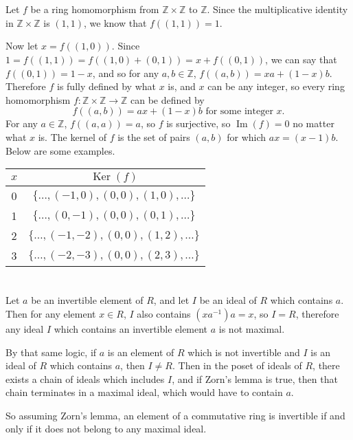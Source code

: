 \documentclass[12pt]{article}
\begin{document}
\section{}
\noindent{}\bigskip\par
Let $f$ be a ring homomorphism from $ \mathbb{Z} \times \mathbb{Z}$ to $ \mathbb{Z}$. Since the multiplicative identity in $ \mathbb{Z} \times \mathbb{Z}$ is $(1,1)$, we know that $f((1,1)) = 1$.
\par
Now let $x=f((1,0))$. Since $1=f((1,1))=f((1,0)+(0,1))=x+f((0,1))$, we can say that $f((0,1))=1-x$, and so for any $a,b \in \mathbb{Z}$, $f((a,b))=xa+(1-x)b$. Therefore $f$ is fully defined by what $x$ is, and $x$ can be any integer, so every ring homomorphism $f: \mathbb{Z} \times \mathbb{Z} \rightarrow \mathbb{Z}$ can be defined by
\[ f((a,b))=ax+(1-x)b \text{ for some integer $x$.} \]
For any $a \in \mathbb{Z}$, $f((a,a))=a$, so $f$ is surjective, so $\operatorname{Im}(f)=0$ no matter what $x$ is. The kernel of $f$ is the set of pairs $(a,b)$ for which $ax=(x-1)b$. Below are some examples.
\begin{center}
    \begin{tabular}{|c|c|}
        \hline
        $x$ & $\operatorname{Ker}(f)$ \\
        \hline
        \hline
        0 & $\{\dots, (-1,0), (0,0), (1,0), \dots\}$ \\
        \hline
        1 & $\{\dots, (0,-1), (0,0), (0,1), \dots \}$ \\
        \hline
        2 & $\{\dots, (-1,-2), (0,0), (1,2), \dots \}$ \\
        \hline
        3 & $\{\dots, (-2,-3), (0,0), (2,3), \dots \}$ \\
        \hline
    \end{tabular}
\end{center}

\section{}
\noindent{}\bigskip\par
Let $a$ be an invertible element of $R$, and let $I$ be an ideal of $R$ which contains $a$. Then for any element $x \in R$, $I$ also contains $(xa^{-1})a=x$, so $I=R$, therefore any ideal $I$ which contains an invertible element $a$ is not maximal.
\par
By that same logic, if $a$ is an element of $R$ which is not invertible and $I$ is an ideal of $R$ which contains $a$, then $I \neq R$. Then in the poset of ideals of $R$, there exists a chain of ideals which includes $I$, and if Zorn's lemma is true, then that chain terminates in a maximal ideal, which would have to contain $a$.
\par
So assuming Zorn's lemma, an element of a commutative ring is invertible if and only if it does not belong to any maximal ideal.
\end{document}
